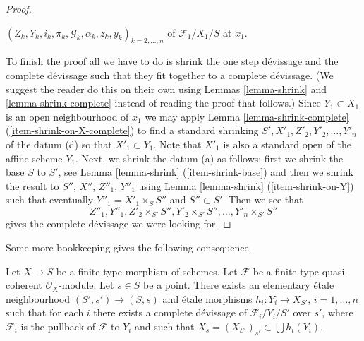 \begin{proof}
\begin{enumerate}
$(Z_k, Y_k, i_k, \pi_k, \mathcal{G}_k, \alpha_k, z_k, y_k)_{k = 2, \ldots, n}$
of $\mathcal{F}_1/X_1/S$ at $x_1$.
\end{enumerate}
To finish the proof all we have to do is shrink the one step d\'evissage
and the complete d\'evissage such that they fit together to a complete
d\'evissage. (We suggest the reader do this on their own using
Lemmas \ref{lemma-shrink} and
\ref{lemma-shrink-complete}
instead of reading the proof that follows.) Since $Y_1 \subset X_1$
is an open neighbourhood of $x_1$ we may apply
Lemma \ref{lemma-shrink-complete} (\ref{item-shrink-on-X-complete})
to find a standard shrinking $S', X'_1, Z'_2, Y'_2, \ldots, Y'_n$
of the datum (d) so that $X'_1 \subset Y_1$. Note that $X'_1$ is also
a standard open of the affine scheme $Y_1$. Next, we shrink the datum
(a) as follows: first we shrink the base $S$ to $S'$, see
Lemma \ref{lemma-shrink} (\ref{item-shrink-base}) and then
we shrink the result to $S''$, $X''$, $Z''_1$, $Y''_1$ using
Lemma \ref{lemma-shrink} (\ref{item-shrink-on-Y})
such that eventually $Y''_1 = X'_1 \times_S S''$ and $S'' \subset S'$.
Then we see that
$$
Z''_1, Y''_1, Z'_2 \times_{S'} S'', Y'_2 \times_{S'} S'', \ldots,
Y'_n \times_{S'} S''
$$
gives the complete d\'evissage we were looking for.
\end{proof}

\noindent
Some more bookkeeping gives the following consequence.

\begin{lemma}
\label{lemma-existence-complete}
Let $X \to S$ be a finite type morphism of schemes.
Let $\mathcal{F}$ be a finite type quasi-coherent $\mathcal{O}_X$-module.
Let $s \in S$ be a point.
There exists an elementary \'etale neighbourhood
$(S', s') \to (S, s)$ and \'etale morphisms
$h_i : Y_i \to X_{S'}$, $i = 1, \ldots, n$ such that for each
$i$ there exists a complete d\'evissage of $\mathcal{F}_i/Y_i/S'$ over $s'$,
where $\mathcal{F}_i$ is the pullback of $\mathcal{F}$ to $Y_i$
and such that $X_s = (X_{S'})_{s'} \subset \bigcup h_i(Y_i)$.
\end{lemma}

